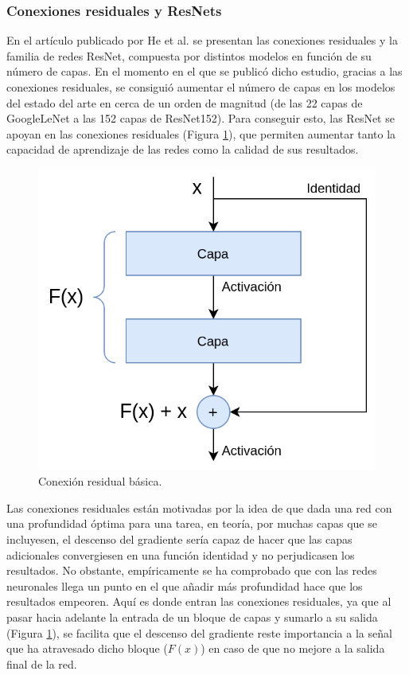 \pagebreak

\subsubsection{Conexiones residuales y ResNets}

En el artículo publicado por He et al. \cite{resnet} se presentan las conexiones residuales y la familia de redes ResNet, compuesta por distintos modelos en función de su número de capas. En el momento en el que se publicó dicho estudio, gracias a las conexiones residuales, se consiguió aumentar el número de capas en los modelos del estado del arte en cerca de un orden de magnitud (de las 22 capas de GoogleLeNet \cite{googlelenet} a las 152 capas de ResNet152). Para conseguir esto, las ResNet se apoyan en las conexiones residuales (Figura \ref{fig:residual}), que permiten aumentar tanto la capacidad de aprendizaje de las redes como la calidad de sus resultados.

\begin{figure}
\vspace{-10pt}
\includegraphics[width=0.95\linewidth]{imagenes/residual-connection.png} 
\caption{Conexión residual básica.}
\label{fig:residual}
\end{figure}

Las conexiones residuales están motivadas por la idea de que dada una red con una profundidad óptima para una tarea, en teoría, por muchas capas que se incluyesen, el descenso del gradiente sería capaz de hacer que las capas adicionales convergiesen en una función identidad y no perjudicasen los resultados. No obstante, empíricamente se ha comprobado que con las redes neuronales llega un punto en el que añadir más profundidad hace que los resultados empeoren. Aquí es donde entran las conexiones residuales, ya que al pasar hacia adelante la entrada de un bloque de capas y sumarlo a su salida (Figura \ref{fig:residual}), se facilita que el descenso del gradiente reste importancia a la señal que ha atravesado dicho bloque ($F(x)$) en caso de que no mejore a la salida final de la red.

